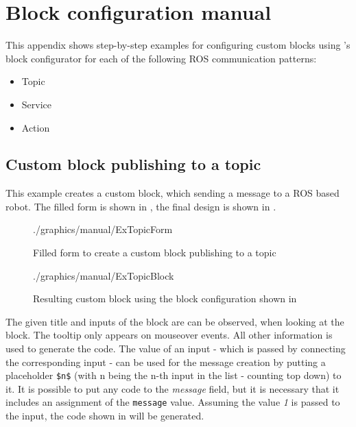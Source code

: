 \chapter{Block configuration manual} \label{apx:BlockConfigManual}
This appendix shows step-by-step examples for configuring custom blocks using \toolname{}'s block configurator for each of the following ROS communication patterns:
\begin{itemize}
    \item Topic
    \item Service
    \item Action
\end{itemize}

\section{Custom block publishing to a topic} \label{sec:CustomTopic}
This example creates a custom block, which sending a message to a ROS based robot. The filled form is shown in , the final design is shown in .

\begin{figure}[htbp]
	\centering
	\begin{overpic}[width=\linewidth]{./graphics/manual/ExTopicForm}
	\end{overpic}
	\caption{Filled form to create a custom block publishing to a topic}%
	\label{fig:ExTopicForm}%
\end{figure}

\begin{figure}[htbp]
	\centering
	\begin{overpic}[width=0.2\linewidth]{./graphics/manual/ExTopicBlock}
	\end{overpic}
	\caption{Resulting custom block using the block configuration shown in }%
	\label{fig:ExTopicBlock}%
\end{figure}

\begin{figure}[h]
	
\end{figure}

The given title and inputs of the block are can be observed, when looking at the block. The tooltip only appears on mouseover events. All other information is used to generate the code. The value of an input - which is passed by connecting the corresponding input - can be used for the message creation by putting a placeholder \lstinline!$n$! (with n being the n-th input in the list - counting top down) to it. It is possible to put any code to the \textit{message} field, but it is necessary that it includes an assignment of the \lstinline!message! value. Assuming the value \textit{1} is passed to the \textit{\metres} input, the code shown in  will be generated.

